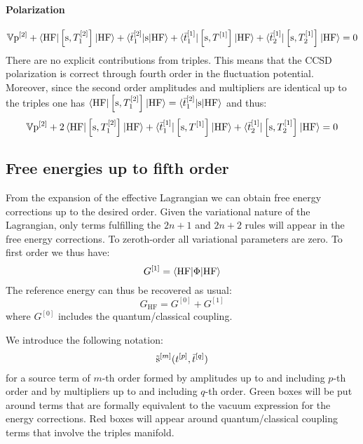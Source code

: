 \paragraph*{Polarization}
\begin{equation}
  \mathbb{V}\mathrm{p}^{[2]} +
  \braket{\mathrm{HF} | \left[ \mathrm{s}, T_1^{[2]} \right]^{}| \mathrm{HF}}
  + \braket{\bar{t}_{1}^{[2]} | \mathrm{s} | \mathrm{HF} }
  + \braket{\bar{t}_{1}^{[1]} | \left[ \mathrm{s}, T^{[1]} \right]^{} | \mathrm{HF}}
  + \braket{\bar{t}_{2}^{[1]} | \left[ \mathrm{s}, T_2^{[1]} \right]^{} | \mathrm{HF}}
  = 0
\end{equation}
There are no explicit contributions from triples. This means that the
\acs{CCSD} polarization is correct through fourth order in the
fluctuation potential.
Moreover, since the second order amplitudes and multipliers are
identical up to the triples one has $\braket{\mathrm{HF} | \left[ \mathrm{s}, T_1^{[2]} \right]^{}| \mathrm{HF}} = \braket{\bar{t}_{1}^{[2]} | \mathrm{s} | \mathrm{HF} }$
and thus:
\begin{equation}\label{eq:2nd-order-pol}
  \mathbb{V}\mathrm{p}^{[2]} +
  2\braket{\mathrm{HF} | \left[ \mathrm{s}, T_1^{[2]} \right]^{}| \mathrm{HF}}
  + \braket{\bar{t}_{1}^{[1]} | \left[ \mathrm{s}, T^{[1]} \right]^{} | \mathrm{HF}}
  + \braket{\bar{t}_{2}^{[1]} | \left[ \mathrm{s}, T_2^{[1]} \right]^{} | \mathrm{HF}}
  = 0
\end{equation}

\subsection{Free energies up to fifth order}\label{sec:energies-pt}

From the expansion of the effective Lagrangian we can obtain free energy
corrections up to the desired order. Given the variational nature of the
Lagrangian, only terms fulfilling the $2n+1$ and $2n+2$ rules will
appear in the free energy corrections.
To zeroth-order all variational parameters are zero. To first order we
thus have:
\begin{equation}\label{eq:first-order-G}
  G^{[1]} = \braket{\mathrm{HF} | \Phi | \mathrm{HF}}
\end{equation}
The reference energy can thus be recovered as usual:
\begin{equation}
  G_\mathrm{HF} = G^{[0]} + G^{[1]}
\end{equation}
where $G^{[0]}$ includes the quantum/classical coupling.

We introduce the following notation:
\begin{equation}
  \tilde{\mathrm{s}}^{[m]}(t_{}^{[p]}, \bar{t}_{}^{[q]})
\end{equation}
for a source term of $m$-th order formed by amplitudes up to and
including $p$-th order and by multipliers up to and including $q$-th order.
Green boxes will be put around terms that are formally equivalent to the
vacuum expression for the energy corrections. Red boxes will appear
around quantum/classical coupling terms that involve the triples
manifold.

